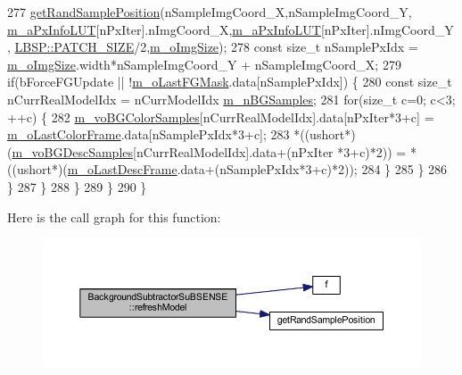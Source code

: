 \begin{DoxyCode}
277                     \mbox{\hyperlink{_rand_utils_8h_aad1feb1fa9a8e94c8fac60b9a01e1a5b}{getRandSamplePosition}}(nSampleImgCoord\_X,nSampleImgCoord\_Y,
      \mbox{\hyperlink{class_background_subtractor_l_b_s_p_a74e73d4832ccdef652d93756582024db}{m\_aPxInfoLUT}}[nPxIter].nImgCoord\_X,\mbox{\hyperlink{class_background_subtractor_l_b_s_p_a74e73d4832ccdef652d93756582024db}{m\_aPxInfoLUT}}[nPxIter].nImgCoord\_Y,
      \mbox{\hyperlink{class_l_b_s_p_aa98abb79a155d3a2b416c2ab32e74929}{LBSP::PATCH\_SIZE}}/2,\mbox{\hyperlink{class_background_subtractor_l_b_s_p_a732d5e6ae35fb0e858cadb3af5ce08a2}{m\_oImgSize}});
278                     \textcolor{keyword}{const} \textcolor{keywordtype}{size\_t} nSamplePxIdx = \mbox{\hyperlink{class_background_subtractor_l_b_s_p_a732d5e6ae35fb0e858cadb3af5ce08a2}{m\_oImgSize}}.width*nSampleImgCoord\_Y + 
      nSampleImgCoord\_X;
279                     \textcolor{keywordflow}{if}(bForceFGUpdate || !\mbox{\hyperlink{class_background_subtractor_l_b_s_p_adb6dc0af596c5592c91f9d8faa5c8a4b}{m\_oLastFGMask}}.data[nSamplePxIdx]) \{
280                         \textcolor{keyword}{const} \textcolor{keywordtype}{size\_t} nCurrRealModelIdx = nCurrModelIdx%
      \mbox{\hyperlink{class_background_subtractor_su_b_s_e_n_s_e_ad783b71b5b942c4018d27cf38b7d7225}{m\_nBGSamples}};
281                         \textcolor{keywordflow}{for}(\textcolor{keywordtype}{size\_t} c=0; c<3; ++c) \{
282                             \mbox{\hyperlink{class_background_subtractor_su_b_s_e_n_s_e_a9d4d4bb930b34745536b9862683bb539}{m\_voBGColorSamples}}[nCurrRealModelIdx].data[nPxIter*3+c] = 
      \mbox{\hyperlink{class_background_subtractor_l_b_s_p_ab1dc003792ab1d0b881a6fd10e0e29b3}{m\_oLastColorFrame}}.data[nSamplePxIdx*3+c];
283                             *((ushort*)(\mbox{\hyperlink{class_background_subtractor_su_b_s_e_n_s_e_a422cc2f2a25c07efca02087bd6fe3d6d}{m\_voBGDescSamples}}[nCurrRealModelIdx].data+(nPxIter
      *3+c)*2)) = *((ushort*)(\mbox{\hyperlink{class_background_subtractor_l_b_s_p_a9c637c0b87cac495887295690d83ba13}{m\_oLastDescFrame}}.data+(nSamplePxIdx*3+c)*2));
284                         \}
285                     \}
286                 \}
287             \}
288         \}
289     \}
290 \}
\end{DoxyCode}
Here is the call graph for this function\+:\nopagebreak
\begin{figure}[H]
\begin{center}
\leavevmode
\includegraphics[width=350pt]{class_background_subtractor_su_b_s_e_n_s_e_abe80bf042f2b7a1f72942460d74b1f02_cgraph}
\end{center}
\end{figure}
